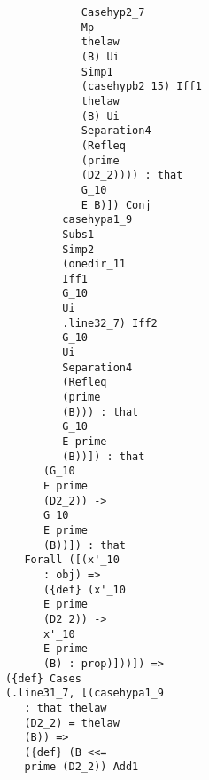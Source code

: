 \documentclass[12pt]{article}
\begin{document}
\begin{verbatim}
                                           Casehyp2_7 
                                           Mp 
                                           thelaw 
                                           (B) Ui 
                                           Simp1 
                                           (casehypb2_15) Iff1 
                                           thelaw 
                                           (B) Ui 
                                           Separation4 
                                           (Refleq 
                                           (prime 
                                           (D2_2)))) : that 
                                           G_10 
                                           E B)]) Conj 
                                        casehypa1_9 
                                        Subs1 
                                        Simp2 
                                        (onedir_11 
                                        Iff1 
                                        G_10 
                                        Ui 
                                        .line32_7) Iff2 
                                        G_10 
                                        Ui 
                                        Separation4 
                                        (Refleq 
                                        (prime 
                                        (B))) : that 
                                        G_10 
                                        E prime 
                                        (B))]) : that 
                                     (G_10 
                                     E prime 
                                     (D2_2)) -> 
                                     G_10 
                                     E prime 
                                     (B))]) : that 
                                  Forall ([(x'_10 
                                     : obj) => 
                                     ({def} (x'_10 
                                     E prime 
                                     (D2_2)) -> 
                                     x'_10 
                                     E prime 
                                     (B) : prop)]))]) => 
                               ({def} Cases 
                               (.line31_7, [(casehypa1_9 
                                  : that thelaw 
                                  (D2_2) = thelaw 
                                  (B)) => 
                                  ({def} (B <<= 
                                  prime (D2_2)) Add1 

\end{verbatim}
\end{document}
